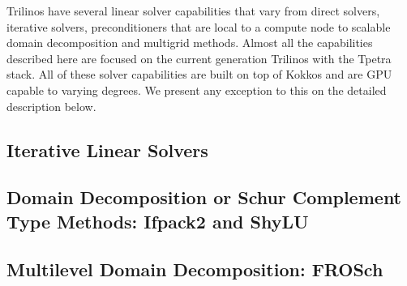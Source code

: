 
Trilinos have several linear solver capabilities that vary from direct solvers, iterative solvers, preconditioners that are local to a compute node to scalable domain decomposition and multigrid methods. Almost all the capabilities described here are focused on the current generation Trilinos with the Tpetra stack. All of these solver capabilities are built on top of Kokkos and are GPU capable to varying degrees. We present any exception to this on the detailed description below.

\subsection{Iterative Linear Solvers}


\subsection{Domain Decomposition or Schur Complement Type Methods: Ifpack2 and ShyLU}


\subsection{Multilevel Domain Decomposition: FROSch}

